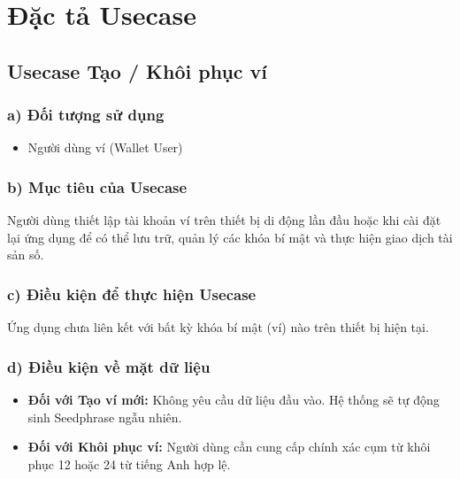 \documentclass[a4paper]{report}
\begin{document}
\section{Đặc tả Usecase}

\subsection{Usecase Tạo / Khôi phục ví}

\subsubsection{a) Đối tượng sử dụng}
\begin{itemize}
    \item Người dùng ví (Wallet User)
\end{itemize}

\subsubsection{b) Mục tiêu của Usecase}
Người dùng thiết lập tài khoản ví trên thiết bị di động lần đầu hoặc khi cài đặt lại ứng dụng để có thể lưu trữ, quản lý các khóa bí mật và thực hiện giao dịch tài sản số.

\subsubsection{c) Điều kiện để thực hiện Usecase}
Ứng dụng chưa liên kết với bất kỳ khóa bí mật (ví) nào trên thiết bị hiện tại.

\subsubsection{d) Điều kiện về mặt dữ liệu}
\begin{itemize}
    \item \textbf{Đối với Tạo ví mới:} Không yêu cầu dữ liệu đầu vào. Hệ thống sẽ tự động sinh Seedphrase ngẫu nhiên.
    \item \textbf{Đối với Khôi phục ví:} Người dùng cần cung cấp chính xác cụm từ khôi phục 12 hoặc 24 từ tiếng Anh hợp lệ.
\end{itemize}
\end{document}

